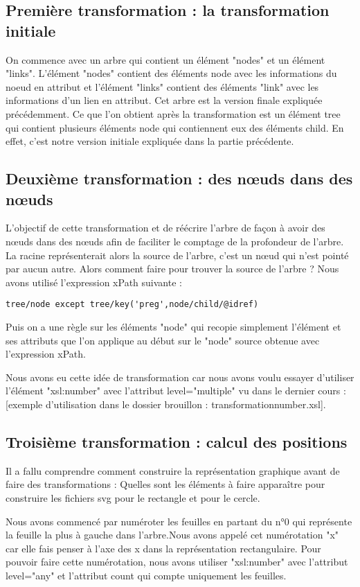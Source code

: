 \documentclass{article}
\begin{document}
\subsection{Première transformation : la transformation initiale}
 On commence avec un arbre qui contient un élément "nodes" et un élément "links". L’élément "nodes" contient des éléments node avec les informations du noeud en attribut et l’élément "links" contient des éléments "link" avec les informations d'un lien en attribut. 
Cet arbre est la version finale expliquée précédemment. 
Ce que l'on obtient après la transformation est un élément tree qui contient plusieurs éléments node qui contiennent eux des éléments child. 
En effet, c'est notre version initiale expliquée dans la partie précédente.
 
\subsection{Deuxième transformation : des nœuds dans des nœuds}

L'objectif de cette transformation et de réécrire l'arbre de façon à avoir des nœuds dans des nœuds afin de faciliter le comptage de la profondeur de l'arbre. 
La racine représenterait alors la source de l'arbre, c'est un nœud qui n'est pointé par aucun autre. Alors comment faire pour trouver la source de l'arbre ?
Nous avons utilisé l'expression xPath suivante :
\begin{lstlisting}
tree/node except tree/key('preg',node/child/@idref)
\end{lstlisting}
Puis on a une règle sur les éléments "node" qui recopie simplement l'élément et ses attributs que l'on applique au début sur le "node" source obtenue avec l'expression xPath.

Nous avons eu cette idée de transformation car nous avons voulu essayer d'utiliser l'élément "xsl:number" avec l'attribut level="multiple" vu dans le dernier cours :[exemple d'utilisation dans le dossier brouillon : transformationnumber.xsl].
\subsection{Troisième transformation : calcul des positions}

Il a fallu comprendre comment construire la représentation graphique avant de faire des transformations : Quelles sont les éléments à faire apparaître pour construire les fichiers svg pour le rectangle et pour le cercle.

Nous avons commencé par numéroter les feuilles en partant du n°0 qui représente la feuille la plus à gauche dans l'arbre.Nous avons appelé cet numérotation "x" car elle fais penser à l'axe des x dans la représentation rectangulaire. Pour pouvoir faire cette numérotation, nous avons utiliser "xsl:number" avec l'attribut level="any" et l'attribut count qui compte uniquement les feuilles. 
\end{document}
